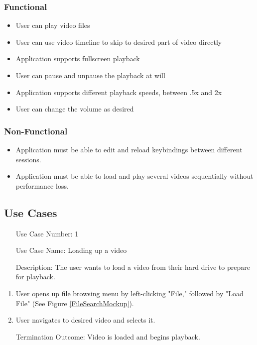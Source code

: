 \documentclass[10pt,conference,onecolumn,compsoc]{IEEEtran}
\begin{document}
\subsubsection{Functional}
\begin{itemize}
\item User can play video files
\item User can use video timeline to skip to desired part of video directly
\item Application supports fullscreen playback 
\item User can pause and unpause the playback at will
\item Application supports different playback speeds, between .5x and 2x
\item User can change the volume as desired
\end{itemize}


\subsubsection{Non-Functional}
\begin{itemize}
\item Application must be able to edit and reload keybindings between different sessions. 
\item Application must be able to load and play several videos sequentially without performance loss.
\end{itemize}

\subsection{Use Cases}

\begin{itemize}
\label{itm:UseCase1}
\item[Use Case Number:] 1
\item[Use Case Name:] Loading up a video
\item[Description:] The user wants to load a video from their hard drive to prepare for playback.
\end{itemize}

\begin{enumerate}
\item User opens up file browsing menu by left-clicking "File," followed by "Load File" (See Figure \ref{FileSearchMockup}).
\item User navigates to desired video and selects it.
\item[Termination Outcome:] Video is loaded and begins playback.
\end{enumerate}
\end{document}

